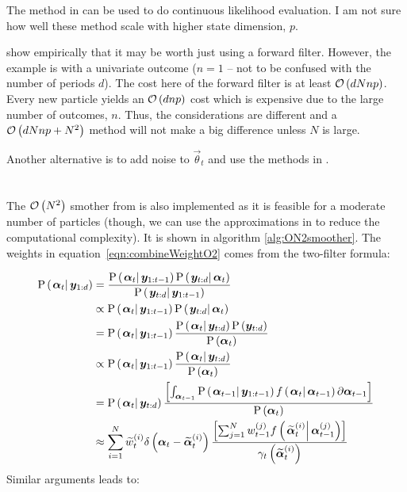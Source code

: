 The method in \citet[see particularly section 6.2 on page 203]{malik11} can be used to do continuous likelihood evaluation. I am not sure how well these method scale with higher state dimension, $p$.

\citet{kantas15} show empirically that it may be worth just using a forward filter. However, the example is with a univariate outcome ($n=1$ -- not to be confused with the number of periods $d$). The cost here of the forward filter is at least $\mathcal{O}\left( dNnp\right)$. Every new particle yields an $\mathcal{O}\left( dnp\right)$ cost which is expensive due to the large number of outcomes, $n$. Thus, the considerations are different and a $\mathcal{O}\left( dNnp + N^2\right)$ method will not make a big difference unless $N$ is large.

Another alternative is to add noise to $\vec{\theta}_{t}$ and use the methods in \cite{andrieu02}.

\section{\citet{briers10}}
The $\mathcal{O}\left( N^2\right)$ smother from \citet{briers10} is also implemented as it is feasible for a moderate number of particles (though, we can use the approximations in \cite{kantas15} to reduce the computational complexity). It is shown in algorithm \ref{alg:ON2smoother}. The weights in equation~\eqref{eqn:combineWeightO2} comes from the two-filter formula:

\begin{equation}\begin{split}
\propC{\vec{\alpha}_t}{\vec{y}_{1:d}} &= 
	\frac{
		\propC{\vec{\alpha}_t}{\vec{y}_{1:{t-1}}}
		\propC{\vec{y}_{t:d}}{\vec{\alpha}_t}
	}{ \propC{\vec{y}_{t:d}}{\vec{y}_{1:{t-1}}}} \\
%
& \propto
	\propC{\vec{\alpha}_t}{\vec{y}_{1:{t-1}}}\propC{\vec{y}_{t:d}}{\vec{\alpha}_t} \\
%
& = \propC{\vec{\alpha}_t}{\vec{y}_{1:{t-1}}}\frac{
		\propC{\vec{\alpha}_t}{\vec{y}_{t:d}}\prop{\vec{y}_{t:d}}
	}{ \prop{\vec{\alpha}_t} } \\
%
& \propto \propC{\vec{\alpha}_t}{\vec{y}_{1:{t-1}}}
	\frac{\propC{\vec{\alpha}_t}{\vec{y}_{t:d}}
	}{ \prop{\vec{\alpha}_t} } \\
%
& = 
	\propC{\vec{\alpha}_t}{\vec{y}_{t:d}}
	\frac{
		\Lbrac{\int_{\vec{\alpha}_{t - 1}}
		\propC{\vec{\alpha}_{t-1}}{\vec{y}_{1:{t-1}}}
		\optorC{f}{\vec{\alpha}_t}{\vec{\alpha}_{t - 1}}
		\partial\vec{\alpha}_{t - 1}}
	}{ \prop{\vec{\alpha}_t} } \\
%
& \approx \sum_{i=1}^N
	\particB{w}{t}{i}
	\dirac{\vec{\alpha}_t - \particB{\vec{\alpha}}{t}{i}}
	\frac{
		\Lbrac{\sum_{j = 1}^N
		\partic{w}{t -1}{j}
		\optorC{f}{\particB{\vec{\alpha}}{t}{i}}{\partic{\vec{\alpha}}{t - 1}{j}}}
	}{ \optor{\gamma_t}{\particB{\vec{\alpha}}{t}{i}} }
\end{split}\end{equation}%
%
Similar arguments leads to:

